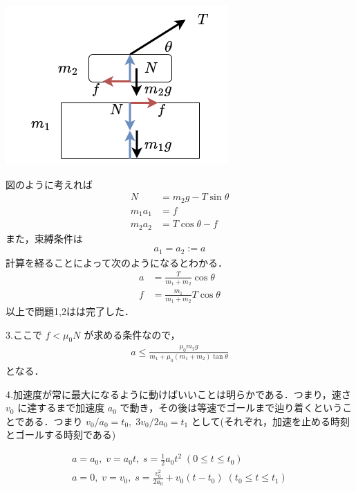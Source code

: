 \documentclass[
  b4paperpaper,
  xelatex,ja=standard]{bxjsbook}
\begin{document}
\includegraphics{source/images/newton/newton18.png}

図のように考えれば \begin{align*}
N&=m_2g-T\sin\theta\\
m_1a_1&=f\\
m_2a_2&=T\cos\theta-f
\end{align*} また，束縛条件は \begin{align*}
a_1=a_2:=a
\end{align*} 計算を経ることによって次のようになるとわかる．
\begin{align*}
a&=\frac{T}{m_1+m_2}\cos\theta\\
f&=\frac{m_1}{m_1+m_2}T\cos\theta
\end{align*} 以上で問題1,2はは完了した．

3.ここで \(f<\mu_0 N\) が求める条件なので， \begin{align*}
a\leq \frac{\mu_0m_2g}{m_1+\mu_0(m_1+m_2)\tan \theta}
\end{align*} となる．

4.加速度が常に最大になるように動けばいいことは明らかである．つまり，速さ
\(v_0\) に達するまで加速度 \(a_0\)
で動き，その後は等速でゴールまで辿り着くということである．つまり
\(v_0/a_0=t_0,\; 3v_0/2a_0 =t_1\)
として(それぞれ，加速を止める時刻とゴールする時刻である)

\begin{align*}
a=a_0,\;v=a_0t,\;s=\frac{1}{2}a_0t^2\;(0\leq t \leq t_0) \\
a=0,\;v=v_0,\;s=\frac{v_0^2}{2a_0} + v_0(t-t_0)\;(t_0\leq t \leq t_1)
\end{align*}
\end{document}
